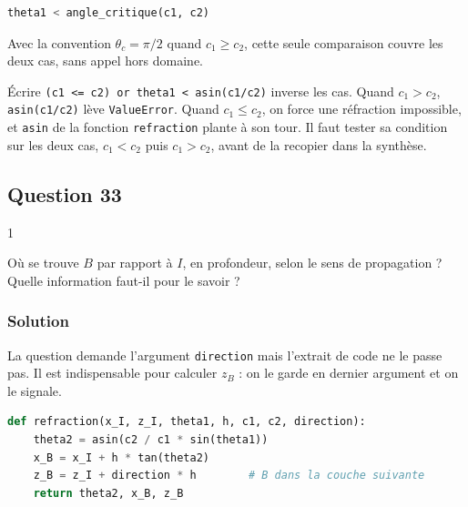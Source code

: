 \documentclass[11pt,a4paper]{article}
\begin{document}
\begin{lstlisting}[language=Python]
theta1 < angle_critique(c1, c2)
\end{lstlisting}

Avec la convention \(\theta_c = \pi/2\) quand \(c_1 \ge c_2\), cette seule comparaison couvre les deux cas, sans appel hors domaine.

\begin{piege}

Écrire \texttt{(\allowbreak{}c1\ \textless{}=\allowbreak{}\ c2)\allowbreak{}\ or\ theta1\ \textless{}\ asin(\allowbreak{}c1/\allowbreak{}c2)\allowbreak{}} inverse les cas. Quand \(c_1 > c_2\), \texttt{asin(c1/c2)} lève \texttt{ValueError}. Quand \(c_1 \le c_2\), on force une réfraction impossible, et \texttt{asin} de la fonction \texttt{refraction} plante à son tour. Il faut tester sa condition sur les deux cas, \(c_1 < c_2\) puis \(c_1 > c_2\), avant de la recopier dans la synthèse.

\end{piege}

\hypertarget{question-33}{%
\subsection{Question 33}\label{question-33}}

\begin{indication}{1}

Où se trouve \(B\) par rapport à \(I\), en profondeur, selon le sens de propagation ? Quelle information faut-il pour le savoir ?

\end{indication}

\hypertarget{solution-32}{%
\subsubsection{Solution}\label{solution-32}}

La question demande l'argument \texttt{direction} mais l'extrait de code ne le passe pas. Il est indispensable pour calculer \(z_B\) : on le garde en dernier argument et on le signale.

\begin{lstlisting}[language=Python]
def refraction(x_I, z_I, theta1, h, c1, c2, direction):
    theta2 = asin(c2 / c1 * sin(theta1))
    x_B = x_I + h * tan(theta2)
    z_B = z_I + direction * h        # B dans la couche suivante
    return theta2, x_B, z_B
\end{lstlisting}
\end{document}
